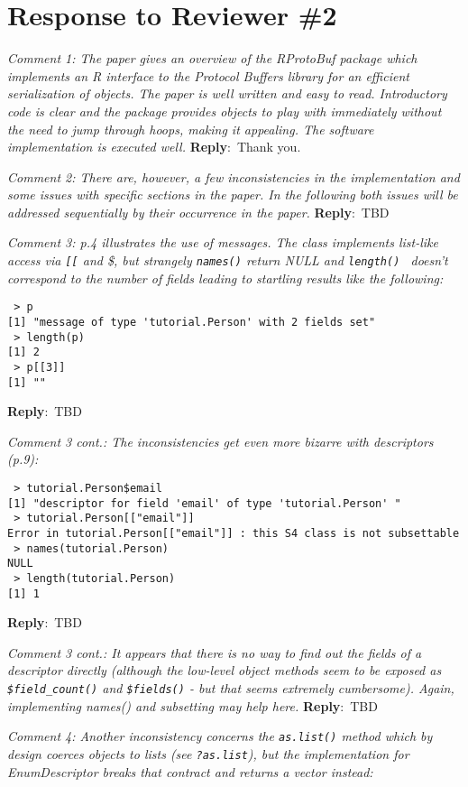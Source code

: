 \documentclass[10pt]{article}
\newcommand{\pointRaised}[2]{\smallskip %
  \textsl{{\fontseries{b}\selectfont #1}: #2}\newline}
\newcommand{\reply}[1]{\textbf{Reply}:\ #1 \smallskip } %
\begin{document}
\section*{Response to Reviewer \#2}

\pointRaised{Comment 1}{The paper gives an overview of the RProtoBuf package which implements an 
  R interface to the Protocol Buffers library for an efficient 
  serialization of objects. The paper is well written and easy to read. 
  Introductory code is clear and the package provides objects to play with 
  immediately without the need to jump through hoops, making it appealing. 
  The software implementation is executed well.}
\reply{Thank you.}

\pointRaised{Comment 2}{There are, however, a few inconsistencies in the implementation and some 
  issues with specific sections in the paper. In the following both issues 
  will be addressed sequentially by their occurrence in the paper.}
\reply{TBD}

\pointRaised{Comment 3}{p.4 illustrates the use of messages. The class implements list-like 
  access via \texttt{[[} and \$, but strangely \texttt{names()} return NULL and \texttt{length() }
  doesn't correspond to the number of fields leading to startling results like
the following:}

\begin{verbatim}
 > p
[1] "message of type 'tutorial.Person' with 2 fields set"
 > length(p)
[1] 2
 > p[[3]]
[1] ""
\end{verbatim}
\reply{TBD}

\pointRaised{Comment 3 cont.}{The inconsistencies get even more bizarre with descriptors (p.9):}

\begin{verbatim}
 > tutorial.Person$email
[1] "descriptor for field 'email' of type 'tutorial.Person' "
 > tutorial.Person[["email"]]
Error in tutorial.Person[["email"]] : this S4 class is not subsettable
 > names(tutorial.Person)
NULL
 > length(tutorial.Person)
[1] 1
\end{verbatim}
\reply{TBD}

\pointRaised{Comment 3 cont.}{It appears that there is no way to find out the fields of a descriptor 
  directly (although the low-level object methods seem to be exposed as 
  \texttt{\$field\_count()} and \texttt{\$fields()} - but that seems extremely cumbersome). 
  Again, implementing names() and subsetting may help here.}
\reply{TBD}

\pointRaised{Comment 4}{Another inconsistency concerns the \texttt{as.list()} method which by design 
  coerces objects to lists (see \texttt{?as.list}), but the implementation for 
  EnumDescriptor breaks that contract and returns a vector instead:}
\end{document}
